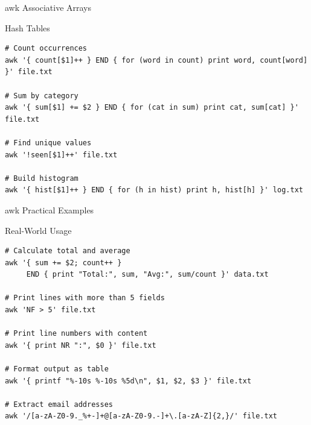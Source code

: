 \documentclass[presentation,aspectratio=1610]{beamer}
\begin{document}
\begin{frame}[label={sec:org39ef616},fragile]{awk Associative Arrays}
 \begin{block}{Hash Tables}
\begin{verbatim}
# Count occurrences
awk '{ count[$1]++ } END { for (word in count) print word, count[word] }' file.txt

# Sum by category
awk '{ sum[$1] += $2 } END { for (cat in sum) print cat, sum[cat] }' file.txt

# Find unique values
awk '!seen[$1]++' file.txt

# Build histogram
awk '{ hist[$1]++ } END { for (h in hist) print h, hist[h] }' log.txt
\end{verbatim}
\end{block}
\end{frame}
\begin{frame}[label={sec:org84ca0cf},fragile]{awk Practical Examples}
 \begin{block}{Real-World Usage}
\begin{verbatim}
# Calculate total and average
awk '{ sum += $2; count++ } 
     END { print "Total:", sum, "Avg:", sum/count }' data.txt

# Print lines with more than 5 fields
awk 'NF > 5' file.txt

# Print line numbers with content
awk '{ print NR ":", $0 }' file.txt

# Format output as table
awk '{ printf "%-10s %-10s %5d\n", $1, $2, $3 }' file.txt

# Extract email addresses
awk '/[a-zA-Z0-9._%+-]+@[a-zA-Z0-9.-]+\.[a-zA-Z]{2,}/' file.txt
\end{verbatim}
\end{block}
\end{frame}
\end{document}

